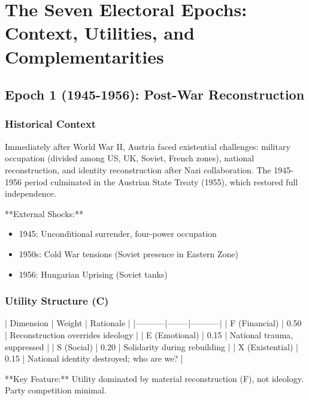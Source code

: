 \clearpage


\section{The Seven Electoral Epochs: Context, Utilities, and Complementarities}
\label{sec:seven-epochs}

\subsection{Epoch 1 (1945-1956): Post-War Reconstruction}

\subsubsection{Historical Context}

Immediately after World War II, Austria faced existential challenges: military occupation (divided among US, UK, Soviet, French zones), national reconstruction, and identity reconstruction after Nazi collaboration. The 1945-1956 period culminated in the Austrian State Treaty (1955), which restored full independence.

**External Shocks:**
\begin{itemize}
\item 1945: Unconditional surrender, four-power occupation
\item 1950s: Cold War tensions (Soviet presence in Eastern Zone)
\item 1956: Hungarian Uprising (Soviet tanks)
\end{itemize}

\subsubsection{Utility Structure (C)}

| Dimension | Weight | Rationale |
|-----------|--------|-----------|
| F (Financial) | 0.50 | Reconstruction overrides ideology |
| E (Emotional) | 0.15 | National trauma, suppressed |
| S (Social) | 0.20 | Solidarity during rebuilding |
| X (Existential) | 0.15 | National identity destroyed; who are we? |

**Key Feature:** Utility dominated by material reconstruction (F), not ideology. Party competition minimal.

